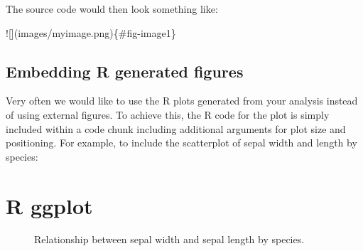 \documentclass[
  letterpaper,
  DIV=11,
  numbers=noendperiod]{scrartcl}
\newenvironment{Shaded}{\begin{snugshade}}{\end{snugshade}}
\newcommand{\CommentTok}[1]{\textcolor[rgb]{0.37,0.37,0.37}{#1}}
\newcommand{\NormalTok}[1]{\textcolor[rgb]{0.00,0.23,0.31}{#1}}
\newcommand{\SpecialCharTok}[1]{\textcolor[rgb]{0.37,0.37,0.37}{#1}}
\begin{document}
The source code would then look something like:

\begin{Shaded}
\begin{Highlighting}[]
\SpecialCharTok{!}\NormalTok{[](images}\SpecialCharTok{/}\NormalTok{myimage.png)\{}\CommentTok{\#fig{-}image1\}}
\end{Highlighting}
\end{Shaded}

\subsection{Embedding R generated
figures}\label{embedding-r-generated-figures}

Very often we would like to use the R plots generated from your analysis
instead of using external figures. To achieve this, the R code for the
plot is simply included within a code chunk including additional
arguments for plot size and positioning. For example, to include the
scatterplot of sepal width and length by species:

\section{R ggplot}

\begin{figure}


\caption{\label{fig-scatterplot1}Relationship between sepal width and
sepal length by species.}

\end{figure}%
\end{document}
